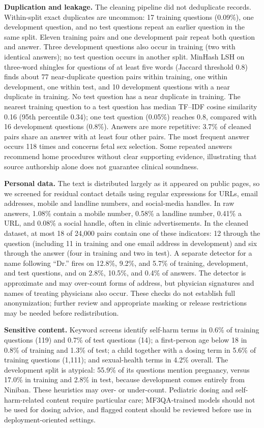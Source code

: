 \documentclass[manuscript,screen,review]{acmart}
\begin{document}
\textbf{Duplication and leakage.} The cleaning pipeline did not deduplicate records. Within-split exact duplicates are uncommon: 17 training questions (0.09\%), one development question, and no test questions repeat an earlier question in the same split. Eleven training pairs and one development pair repeat both question and answer. Three development questions also occur in training (two with identical answers); no test question occurs in another split. MinHash LSH on three-word shingles for questions of at least five words (Jaccard threshold 0.8) finds about 77 near-duplicate question pairs within training, one within development, one within test, and 10 development questions with a near duplicate in training. No test question has a near duplicate in training. The nearest training question to a test question has median TF--IDF cosine similarity 0.16 (95th percentile 0.34); one test question (0.05\%) reaches 0.8, compared with 16 development questions (0.8\%). Answers are more repetitive: 3.7\% of cleaned pairs share an answer with at least four other pairs. The most frequent answer occurs 118 times and concerns fetal sex selection. Some repeated answers recommend home procedures without clear supporting evidence, illustrating that source authorship alone does not guarantee clinical soundness.

\textbf{Personal data.} The text is distributed largely as it appeared on public pages, so we screened for residual contact details using regular expressions for URLs, email addresses, mobile and landline numbers, and social-media handles. In raw answers, 1.08\% contain a mobile number, 0.58\% a landline number, 0.41\% a URL, and 0.08\% a social handle, often in clinic advertisements. In the cleaned dataset, at most 18 of 24,000 pairs contain one of these indicators: 12 through the question (including 11 in training and one email address in development) and six through the answer (four in training and two in test). A separate detector for a name following ``Dr.'' fires on 12.8\%, 9.2\%, and 5.7\% of training, development, and test questions, and on 2.8\%, 10.5\%, and 0.4\% of answers. The detector is approximate and may over-count forms of address, but physician signatures and names of treating physicians also occur. These checks do not establish full anonymization; further review and appropriate masking or release restrictions may be needed before redistribution.

\textbf{Sensitive content.} Keyword screens identify self-harm terms in 0.6\% of training questions (119) and 0.7\% of test questions (14); a first-person age below 18 in 0.8\% of training and 1.3\% of test; a child together with a dosing term in 5.6\% of training questions (1,111); and sexual-health terms in 4.2\% overall. The development split is atypical: 55.9\% of its questions mention pregnancy, versus 17.0\% in training and 2.8\% in test, because development comes entirely from Niniban. These heuristics may over- or under-count. Pediatric dosing and self-harm-related content require particular care; MF3QA-trained models should not be used for dosing advice, and flagged content should be reviewed before use in deployment-oriented settings.
\end{document}

